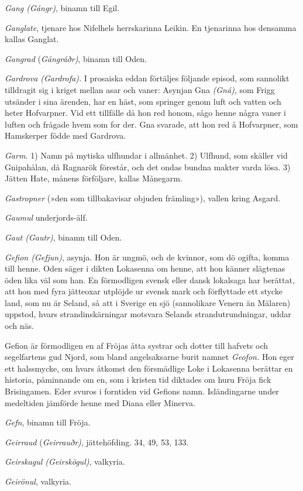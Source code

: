 \emph{Gang (Gángr)}, binamn till Egil.

\emph{Ganglate}, tjenare hos Nifelhels herrskarinna Leikin. En
tjenarinna hos densamma kallas Ganglat.

\emph{Gangrad} (\emph{Gángráðr)}, binamn till Oden.

\emph{Gardrova (Gardrofa).} I prosaiska eddan förtäljes följande episod,
som sannolikt tilldragit sig i kriget mellan asar och vaner: Asynjan Gna
\emph{(Gná)}, som Frigg utsänder i sina ärenden, har en häst, som
springer genom luft och vatten och heter Hofvarpner. Vid ett tillfälle
då hon red honom, sågo henne några vaner i luften och frågade hvem som
for der. Gna svarade, att hon red å Hofvarpner, som Hamskerper födde med
Gardrova.

\emph{Garm.} 1) Namn på mytiska ulfhundar i allmänhet. 2) Ulfhund, som
skäller vid Gnipahålan, då Ragnarök förestår, och det ondas bundna
makter varda lösa. 3) Jätten Hate, månens förföljare, kallas Månegarm.

\emph{Gastropner} (»den som tillbakavisar objuden främling»), vallen
kring Asgard.

\emph{Gaumul} underjords-älf.

\emph{Gaut (Gautr)}, binamn till Oden.

\emph{Gefion (Gefjun)}, asynja. Hon är ungmö, och de kvinnor, som dö
ogifta, komma till henne. Oden säger i dikten Lokasenna om henne, att
hon känner slägtenas öden lika väl som han. En förmodligen svensk eller
dansk lokalsaga har berättat, att hon med fyra jätteoxar utplöjde ur
svensk mark och förflyttade ett stycke land, som nu är Seland, så att i
Sverige en sjö (sannolikare Venern än Mälaren) uppstod, hvars
strandinskärningar motsvara Selands strandutrundningar, uddar och näs.

Gefion är förmodligen en af Fröjas åtta systrar och dotter till hafvets
och segelfartens gud Njord, som bland angelsaksarne burit namnet
\emph{Geofon.} Hon eger ett halssmycke, om hvars åtkomst den försmädlige
Loke i Lokasenna berättar en historia, påminnande om en, som i kristen
tid diktades om huru Fröja fick Brisingamen. Eder svuros i forntiden vid
Gefions namn. Isländingarne under medeltiden jämförde henne med Diana
eller Minerva.

\emph{Gefn}, binamn till Fröja.

\emph{Geirraud} (\emph{Geirrauðr)}, jättehöfding. 34, 49, 53, 133.

\emph{Geirskagul (Geirskögul)}, valkyria.

\emph{Geirönul}, valkyria.

